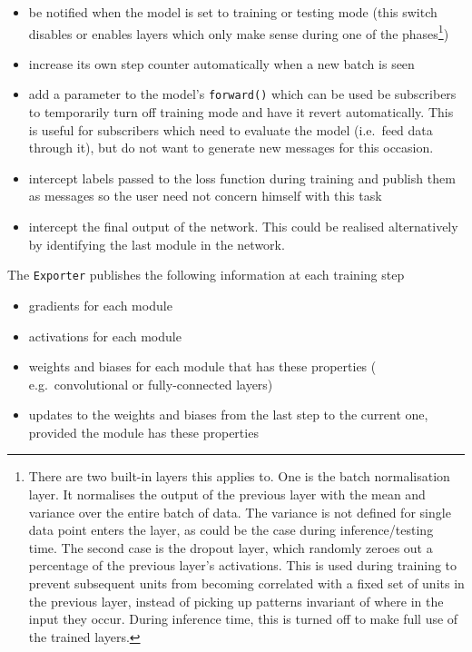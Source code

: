 \begin{itemize}
    \item
        be notified when the model is set to training or testing mode (this
        switch disables or enables layers which only make sense during one of
        the phases\footnote{There are two built-in layers this applies to. One
            is the batch normalisation layer. It normalises the output of the
            previous layer with the mean and variance over the entire batch of
            data. The variance is not defined for single data point enters the
            layer, as could be the case during inference/testing time. The
            second case is the dropout layer, which randomly zeroes out a
            percentage of the previous layer's activations. This is used during
            training to prevent subsequent units from becoming correlated with a
            fixed set of units in the previous layer, instead of picking up
            patterns invariant of where in the input they occur. During
            inference time, this is turned off to make full use of the trained
        layers.})
    \item
        increase its own step counter automatically when a new batch is seen
    \item
        add a parameter to the model's \texttt{forward()}
        which can be used be subscribers to temporarily turn off training mode
        and have it revert automatically. This is useful for subscribers which
        need to evaluate the model (i.e.~feed data through it), but do not
        want to generate new messages for this occasion.
    \item
        intercept labels passed to the loss function during training and
        publish them as messages so the user need not concern himself with
        this task
    \item
        intercept the final output of the network. This could be realised
        alternatively by identifying the last module in the network.
\end{itemize}

The \texttt{Exporter} publishes the following
information at each training step

\begin{itemize}
    \item
        gradients for each module
    \item
        activations for each module
    \item
        weights and biases for each module that has these properties (
        e.g.~convolutional or fully-connected layers)
    \item
        updates to the weights and biases from the last step to the current
        one, provided the module has these properties
\end{itemize}

